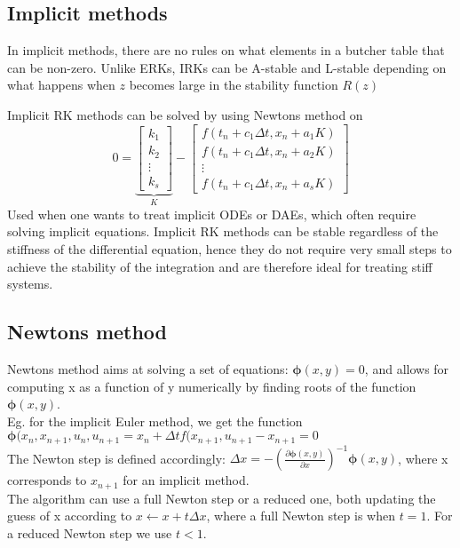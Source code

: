 \subsection{Implicit methods}
In implicit methods, there are no rules on what elements in a butcher table that can be non-zero.
Unlike ERKs, IRKs can be A-stable and L-stable depending on what happens when $z$ becomes large in the stability function $R(z)$

Implicit RK methods can be solved by using Newtons method on 
$$
0 =
\underbrace{\begin{bmatrix}
k_1 \\ k_2 \\ \vdots \\ k_s
\end{bmatrix}}_K -
\begin{bmatrix}
f(t_n+c_1\Delta t,x_n+a_1K) \\ f(t_n+c_1\Delta t,x_n+a_2K) \\ \vdots \\ f(t_n+c_1\Delta t,x_n+a_sK)
\end{bmatrix}
$$
Used when one wants to treat implicit ODEs or DAEs, which often require solving implicit equations. Implicit RK methods can be stable regardless of the stiffness of the differential
equation, hence they do not require very small steps to achieve the stability of the integration
and are therefore ideal for treating stiff systems.

\subsection{Newtons method}
Newtons method aims at solving a set of equations: $\boldsymbol{\phi}(x,y)=0$, and allows for computing x as a function of y numerically by finding roots of the function $\boldsymbol{\phi}(x,y)$.  \\
Eg. for the implicit Euler method, we get the function $\boldsymbol{\phi}(x_n, x_{n+1}, u_n, u_{n+1} = x_n + \Delta t f(x_{n+1}, u_{n+1} - x_{n+1} = 0$ \\
The Newton step is defined accordingly: $\Delta x = - (\frac{\partial \boldsymbol{\phi}(x,y)}{\partial x})^{-1} \boldsymbol{\phi}(x,y)$, where x corresponds to $x_{n+1}$ for an implicit method. \\
The algorithm can use a full Newton step or a reduced one, both updating the guess of x according to $x \leftarrow x + t \Delta x$, where a full Newton step is when $t=1$. For a reduced Newton step we use $t<1$. \\



